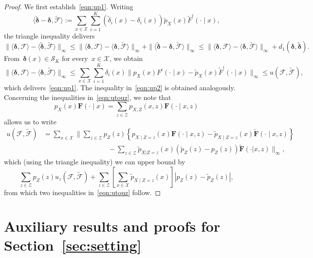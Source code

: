 \documentclass[11pt, a4paper]{article}
\theoremstyle{definition}
\begin{document}
\begin{proof}
We first establish~\eqref{eqn:up1}. Writing $$\langle \tilde{\bm{\delta}} - \bm{\delta}, \tilde{\mathcal{F}} \rangle := \sum_{x \in \mathcal{X}} \sum_{i = 1}^K (\tilde{\delta}_i(x) - \delta_i(x)) \tilde{p}_X(x) \tilde{F}^i(\cdot \mid x),$$ the triangle inequality delivers $$\| \langle \bm{\delta}, \mathcal{F} \rangle - \langle \tilde{\bm{\delta}}, \tilde{\mathcal{F}} \rangle \|_{\infty} \leq \| \langle \bm{\delta}, \mathcal{F} \rangle - \langle \bm{\delta}, \tilde{\mathcal{F}} \rangle  \|_{\infty} + \|  \langle \tilde{\bm{\delta}} - \bm{\delta}, \tilde{\mathcal{F}} \rangle \|_{\infty} \leq \| \langle \bm{\delta}, \mathcal{F} \rangle - \langle \bm{\delta}, \tilde{\mathcal{F}} \rangle  \|_{\infty} +  d_1(\bm{\delta}, \tilde{\bm{\delta}}).$$ From~$\bm{\delta}(x) \in \mathscr{S}_K$ for every~$x \in \mathcal{X}$, we obtain $$\| \langle \bm{\delta}, \mathcal{F} \rangle - \langle \bm{\delta}, \tilde{\mathcal{F}} \rangle  \|_{\infty} \leq \sum_{x \in \mathcal{X}} \sum_{i = 1}^K \delta_i(x) \| p_X(x) F^i(\cdot \mid x) - \tilde{p}_X(x) \tilde{F}^i(\cdot \mid x) \|_{\infty} \leq u(\mathcal{F}, \tilde{\mathcal{F}}),$$ which delivers~\eqref{eqn:up1}. The inequality in~\eqref{eqn:up2} is obtained analogously. Concerning the inequalities in~\eqref{eqn:utouz}, we note that~$$p_X(x) \bm{F}(\cdot \mid x) = \sum_{z \in \mathcal{Z}} p_{X, Z}(x, z) \bm{F}(\cdot \mid x, z)$$ allows us to write \begin{align*}
u(\mathcal{F}, \tilde{\mathcal{F}}) &= \sum_{x \in \mathcal{X}} \| \sum_{z \in \mathcal{Z}} p_Z(z) \left \{
p_{X \mid Z = z}(x) \bm{F}(\cdot \mid x, z) - \tilde{p}_{X \mid Z = z}(x) \tilde{\bm{F}}(\cdot \mid x, z) 
\right\} \\ & \hspace{4cm} - \sum_{z \in \mathcal{Z}} \tilde{p}_{X|Z = z}(x) \left(\tilde{p}_Z(z) - p_Z(z)\right) \tilde{\bm{F}}(\cdot | x, z) \|_{\infty},
\end{align*}
which (using the triangle inequality) we can upper bound by $$\sum_{z \in \mathcal{Z}} p_Z(z) u_z(\mathcal{F}, \tilde{\mathcal{F}}) + \sum_{z \in \mathcal{Z}} \left[ \sum_{x \in \mathcal{X}} \tilde{p}_{X \mid Z = z}(x) \right] |p_Z(z) - \tilde{p}_Z(z)|,$$ from which two inequalities in~\eqref{eqn:utouz} follow.
\end{proof}


\section{Auxiliary results and proofs for Section~\ref{sec:setting}}\label{app:proofsmain}
\end{document}
